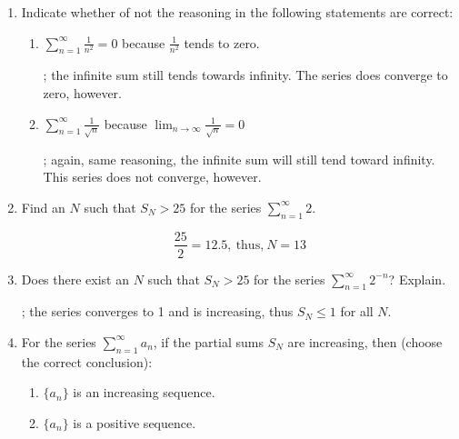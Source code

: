 \documentclass{nosvagor-notes}
\begin{document}
\begin{enumerate}
  \item Indicate whether of not the reasoning in the following statements are
    correct:
    \begin{enumerate}
      \item \(\displaystyle \sum_{n=1}^{\infty} \frac{1}{n^2} = 0\) because
        \(\frac{1}{n^2}\) tends to zero.

      \vspace{16pt}
      ; the infinite sum still tends towards infinity. The series
      does converge to zero, however.

      \vspace{30pt}
      \item \(\displaystyle \sum_{n=1}^{\infty} \frac{1}{\sqrt{n}}\) because
        \(\displaystyle \lim_{n \to \infty}\frac{1}{\sqrt{n} } = 0\)

      \vspace{16pt}
      ; again, same reasoning, the infinite sum will still tend
      toward infinity. This series does not converge, however.

    \end{enumerate}
    \vspace{60pt}

  \item Find an \(N\) such that \(S_N > 25\) for the series \(\displaystyle
    \sum_{n=1}^{\infty} 2\).

    \[%
    \frac{25}{2} = 12.5, ~\text{thus,}~ N = 13
    \]%
    \vspace{60pt}

  \item Does there exist an \(N\) such that \(S_N > 25\) for the series
    \(\displaystyle \sum_{n=1}^{\infty} 2^{-n}\)? Explain.

    \vspace{16pt}
    ; the series converges to 1 and is increasing, thus \(S_N \leq
    1\) for all \(N\).

  \newpage

  \item For the series \(\displaystyle \sum_{n=1}^{\infty} a_n\), if the
    partial sums \(S_N\) are increasing, then (choose the correct conclusion):
    \begin{enumerate}
      \item \(\{a_n\}\) is an increasing sequence. 
      \item \(\{a_n\}\) is a positive sequence. 
    \end{enumerate}
  \vspace{60pt}


\end{enumerate}
\end{document}
